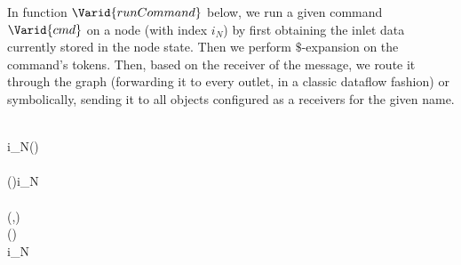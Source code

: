 In function \ensuremath{\Varid{runCommand}} below, we run a given command \ensuremath{\Varid{cmd}} on a
node (with index \ensuremath{i_{N}}) by first obtaining the inlet data currently
stored in the node state. Then we perform $\$$-expansion on the command's
tokens. Then, based on the receiver of the message, we route it through the
graph (forwarding it to every outlet, in a classic dataflow fashion) or
symbolically, sending it to all objects configured as a receivers for the
given name.

\begin{hscode}\SaveRestoreHook
{}%
%
%
%
%
\>[B]{}\mathbin{::}\to {}\to {}\to {}\to {}\<[E]%
\\
\>[B]{}\;\;i_{N}\;(\;\;\;\;)\;\mathrel{=}{}\<[E]%
\\
\>[B]{}\<[4]%
\>[4]{}\<[E]%
\\
\>[4]{}\<[7]%
\>[7]{}(\;\;)\mathrel{=}\;\;i_{N}{}\<[E]%
\\
\>[4]{}\<[7]%
\>[7]{}\mathrel{=}\;\;\<[E]%
\\
\>[4]{}\<[7]%
\>[7]{}(,)\mathrel{=}\;\;\<[E]%
\\
\>[4]{}\<[7]%
\>[7]{}\mathrel{=}\;(\;\;)\;\<[E]%
\\
\>[4]{}\<[7]%
\>[7]{}\mathrel{=}\;i_{N}\;\;\<[E]%
\\
\>[4]{}\<[7]%
\>[7]{}\mathrel{=}\;\;\;\;\<[E]%
\\
\>[B]{}\<[4]%
\>[4]{}\<[E]%
\\
\>[4]{}\<[7]%
\>[7]{}\;\;\<[E]%
\\
\>[4]{}\<[7]%
\>[7]{}\to {}\<[E]%

\end{hscode}
